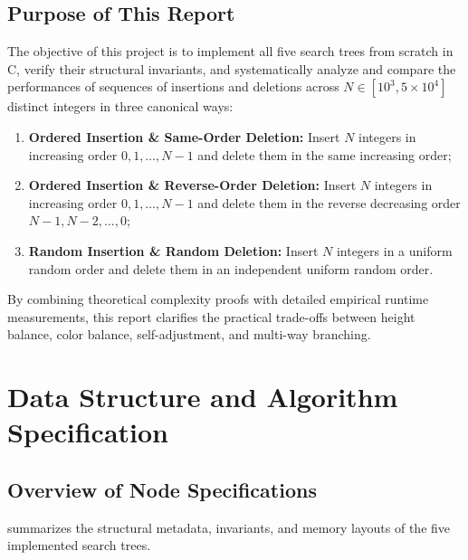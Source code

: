 \documentclass[10pt, a4paper]{article}
\begin{document}
\subsection{Purpose of This Report}
The objective of this project is to implement all five search trees from scratch in C, verify their structural invariants, and systematically analyze and compare the performances of sequences of insertions and deletions across $N \in [10^3, 5\times 10^4]$ distinct integers in three canonical ways:
\begin{enumerate}[label=\textbf{\color{primary}\arabic*.}]
  \item \textbf{Ordered Insertion \& Same-Order Deletion:} Insert $N$ integers in increasing order $0, 1, \dots, N-1$ and delete them in the same increasing order;
  \item \textbf{Ordered Insertion \& Reverse-Order Deletion:} Insert $N$ integers in increasing order $0, 1, \dots, N-1$ and delete them in the reverse decreasing order $N-1, N-2, \dots, 0$;
  \item \textbf{Random Insertion \& Random Deletion:} Insert $N$ integers in a uniform random order and delete them in an independent uniform random order.
\end{enumerate}
By combining theoretical complexity proofs with detailed empirical runtime measurements, this report clarifies the practical trade-offs between height balance, color balance, self-adjustment, and multi-way branching.

\clearpage

\section{Data Structure and Algorithm Specification}

\subsection{Overview of Node Specifications}
 summarizes the structural metadata, invariants, and memory layouts of the five implemented search trees.
\end{document}
